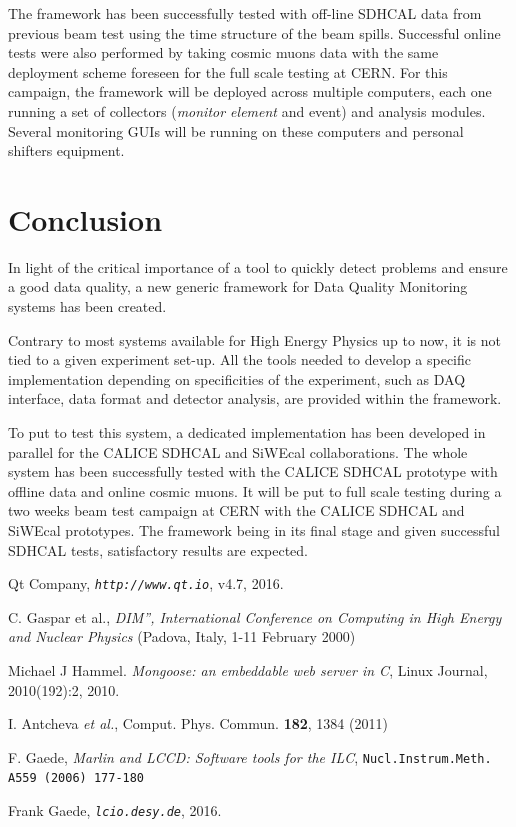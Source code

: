 \documentclass[conference]{IEEEtran}
\begin{document}
The framework has been successfully tested with off-line SDHCAL data from previous beam test using the time structure of the beam spills. Successful online tests were also performed by taking cosmic muons data with the same deployment scheme foreseen for the full scale testing at CERN. For this campaign, the framework will be deployed across multiple computers, each one running a set of collectors (\textit{monitor element} and event) and analysis modules. Several monitoring GUIs will be running on these computers and personal shifters equipment.


\section{Conclusion}
In light of the critical importance of a tool to quickly detect problems and ensure a good data quality, a new generic framework for Data Quality Monitoring systems has been created.

Contrary to most systems available for High Energy Physics up to now, it is not tied to a given experiment set-up. All the tools needed to develop a specific implementation depending on specificities of the experiment, such as DAQ interface, data format and detector analysis, are provided within the framework.

To put to test this system, a dedicated implementation has been developed in parallel for the CALICE SDHCAL and SiWEcal collaborations. 
The whole system has been successfully tested with the CALICE SDHCAL prototype with offline data and online cosmic muons.  It will be put to full scale testing during a two weeks beam test campaign at CERN with the CALICE SDHCAL and SiWEcal prototypes. The framework being in its final stage and given successful SDHCAL tests, satisfactory results are expected.

\begin{thebibliography}{1}
  
Qt Company, \emph{\tt http://www.qt.io}, v4.7, 2016.

C. Gaspar et al., \emph{DIM”, International Conference on Computing in High Energy and Nuclear Physics} (Padova,  Italy,
1-11 February 2000)

Michael J Hammel. \emph{Mongoose: an embeddable web server in C}, Linux Journal, 2010(192):2, 2010.

I. Antcheva \textit{et al.}, Comput. Phys. Commun. \textbf{182}, 1384 (2011)

F. Gaede, {\it Marlin and LCCD: Software tools for the ILC}, {\tt Nucl.Instrum.Meth. A559 (2006) 177-180}

Frank Gaede, \emph{\tt lcio.desy.de}, 2016.

\end{thebibliography}
  
\end{document}
